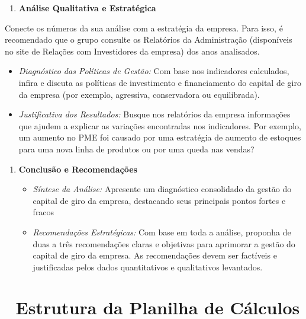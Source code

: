 \documentclass[
  a4paper,
]{book}
\providecommand{\tightlist}{%
  \setlength{\itemsep}{0pt}\setlength{\parskip}{0pt}}\usepackage{longtable,booktabs,array}
\begin{document}
\begin{enumerate}
\def\labelenumi{\arabic{enumi}.}
\setcounter{enumi}{2}
\tightlist
\item
  \textbf{Análise Qualitativa e Estratégica}
\end{enumerate}

Conecte os números da sua análise com a estratégia da empresa. Para
isso, é recomendado que o grupo consulte os Relatórios da Administração
(disponíveis no site de Relações com Investidores da empresa) dos anos
analisados.

\begin{itemize}
\tightlist
\item
  \emph{Diagnóstico das Políticas de Gestão:} Com base nos indicadores
  calculados, infira e discuta as políticas de investimento e
  financiamento do capital de giro da empresa (por exemplo, agressiva,
  conservadora ou equilibrada).\\
\item
  \emph{Justificativa dos Resultados:} Busque nos relatórios da empresa
  informações que ajudem a explicar as variações encontradas nos
  indicadores. Por exemplo, um aumento no PME foi causado por uma
  estratégia de aumento de estoques para uma nova linha de produtos ou
  por uma queda nas vendas?\\
\end{itemize}

\begin{enumerate}
\def\labelenumi{\arabic{enumi}.}
\setcounter{enumi}{3}
\item
  \textbf{Conclusão e Recomendações}

  \begin{itemize}
  \tightlist
  \item
    \emph{Síntese da Análise:} Apresente um diagnóstico consolidado da
    gestão do capital de giro da empresa, destacando seus principais
    pontos fortes e fracos\\
  \item
    \emph{Recomendações Estratégicas:} Com base em toda a análise,
    proponha de duas a três recomendações claras e objetivas para
    aprimorar a gestão do capital de giro da empresa. As recomendações
    devem ser factíveis e justificadas pelos dados quantitativos e
    qualitativos levantados.\\
  \end{itemize}
\end{enumerate}

\section{📑 Estrutura da Planilha de
Cálculos}\label{estrutura-da-planilha-de-cuxe1lculos}
\end{document}
